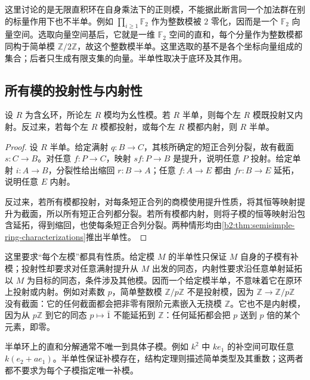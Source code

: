 \ProseParagraphBreak
这里讨论的是无限直积环在自身乘法下的正则模，不能据此断言同一个加法群在别的标量作用下也不半单。例如 \(\prod_{i\ge1}\mathbb F_2\) 作为整数模被 \(2\) 零化，因而是一个 \(\mathbb F_2\) 向量空间。选取向量空间基后，它就是一维 \(\mathbb F_2\) 空间的直和，每个分量作为整数模都同构于简单模 \(\mathbb Z/2\mathbb Z\)，故这个整数模半单。这里选取的基不是各个坐标向量组成的集合；后者只生成有限支集的向量。半单性取决于底环及其作用。

\subsection{所有模的投射性与内射性}
\label{b2:subsec:1302:02}

\begin{proposition}\label{b2:prop:semisimple-projective-injective}
	设 \(R\) 为含幺环，所论左 \(R\) 模均为幺性模。若 \(R\) 半单，则每个左 \(R\) 模既投射又内射。反过来，若每个左 \(R\) 模都投射，或每个左 \(R\) 模都内射，则 \(R\) 半单。
\end{proposition}
\begin{proof}
	设 \(R\) 半单。给定满射 \(q:B\to C\)，其核所确定的短正合列分裂，故有截面 \(s:C\to B\)。对任意 \(f:P\to C\)，映射 \(sf:P\to B\) 是提升，说明任意 \(P\) 投射。给定单射 \(i:A\to B\)，分裂性给出缩回 \(r:B\to A\)；任意 \(f:A\to E\) 都由 \(fr:B\to E\) 延拓，说明任意 \(E\) 内射。

	反过来，若所有模都投射，对每条短正合列的商模使用提升性质，将其恒等映射提升为截面，所以所有短正合列都分裂。若所有模都内射，则将子模的恒等映射沿包含延拓，得到缩回，也使每条短正合列分裂。两种情形均由\cref{b2:thm:semisimple-ring-characterizations}推出半单性。
\end{proof}

这里要求“每个左模”都具有性质。给定模 \(M\) 的半单性只保证 \(M\) 自身的子模有补模；投射性却要求对任意满射提升从 \(M\) 出发的同态，内射性要求沿任意单射延拓以 \(M\) 为目标的同态，条件涉及其他模。因而一个给定模半单，不意味着它在原环上投射或内射。例如对素数 \(p\)，简单整数模 \(\mathbb Z/p\mathbb Z\) 不是投射模，因为 \(\mathbb Z\to\mathbb Z/p\mathbb Z\) 没有截面：它的任何截面都会把非零有限阶元素嵌入无挠模 \(\mathbb Z\)。它也不是内射模，因为从 \(p\mathbb Z\) 到它的同态 \(p\mapsto\bar1\) 不能延拓到 \(\mathbb Z\)：任何延拓都会把 \(p\) 送到 \(p\) 倍的某个元素，即零。

\ProseParagraphBreak
半单环上的直和分解通常不唯一到具体子模。例如 \(k^2\) 中 \(ke_1\) 的补空间可取任意 \(k(e_2+ae_1)\)。半单性保证补模存在，结构定理则描述简单类型及其重数；这两者都不要求为每个子模指定唯一补模。


